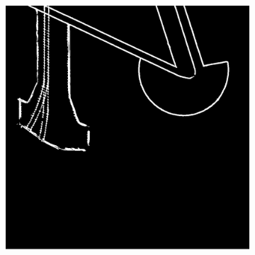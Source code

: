 \documentclass[12pt]{article}
\begin{document}
\begin{figure}[H]
\begin{subfigure}[b]{.28\textwidth}
\begin{minipage}[t]{1\linewidth}
		\end{minipage}
	\end{subfigure}
	\begin{subfigure}[b]{.28\textwidth}
		\begin{minipage}[t]{1\linewidth}
			\centering
			\includegraphics[width=1\linewidth]{images/patches/pre8.png}
		\end{minipage}
	\end{subfigure}

	\vspace{+2mm}
    \setcounter{subfigure}{0}
    

\end{figure}
\end{document}
